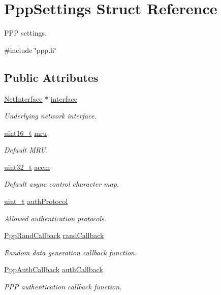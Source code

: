 \hypertarget{structPppSettings}{}\section{Ppp\+Settings Struct Reference}
\label{structPppSettings}


P\+PP settings.  




{\ttfamily \#include \char`\"{}ppp.\+h\char`\"{}}

\subsection*{Public Attributes}
\begin{DoxyCompactItemize}
\item 
\hyperlink{net_8h_a2234db8911a1148c9159979d8f5e0d6b}{Net\+Interface} $\ast$ \hyperlink{structPppSettings_a41a15a72350cde4438f491ddba81008a}{interface}
\begin{DoxyCompactList}\small\item\em Underlying network interface. \end{DoxyCompactList}\item 
\hyperlink{stdint_8h_a273cf69d639a59973b6019625df33e30}{uint16\+\_\+t} \hyperlink{structPppSettings_a6a19b72b250787099c5e704dbadcdce0}{mru}
\begin{DoxyCompactList}\small\item\em Default M\+RU. \end{DoxyCompactList}\item 
\hyperlink{stdint_8h_a435d1572bf3f880d55459d9805097f62}{uint32\+\_\+t} \hyperlink{structPppSettings_a5b90c3b4cf91d8ad6ed514b72fe5df06}{accm}
\begin{DoxyCompactList}\small\item\em Default async control character map. \end{DoxyCompactList}\item 
\hyperlink{compiler__port_8h_a12a1e9b3ce141648783a82445d02b58d}{uint\+\_\+t} \hyperlink{structPppSettings_a81721d1a0829cda028bee35921661eb6}{auth\+Protocol}
\begin{DoxyCompactList}\small\item\em Allowed authentication protocols. \end{DoxyCompactList}\item 
\hyperlink{ppp_8h_a3f556a989f90c87feeb674ffa97a5827}{Ppp\+Rand\+Callback} \hyperlink{structPppSettings_a1c589432617efd3704cfb709256d0210}{rand\+Callback}
\begin{DoxyCompactList}\small\item\em Random data generation callback function. \end{DoxyCompactList}\item 
\hyperlink{ppp_8h_aa73df69aa2d4dfe90d40921e51ac8fcd}{Ppp\+Auth\+Callback} \hyperlink{structPppSettings_a4b619da9280c64b1494efa226a1cdf07}{auth\+Callback}
\begin{DoxyCompactList}\small\item\em P\+PP authentication callback function. \end{DoxyCompactList}\end{DoxyCompactItemize}



